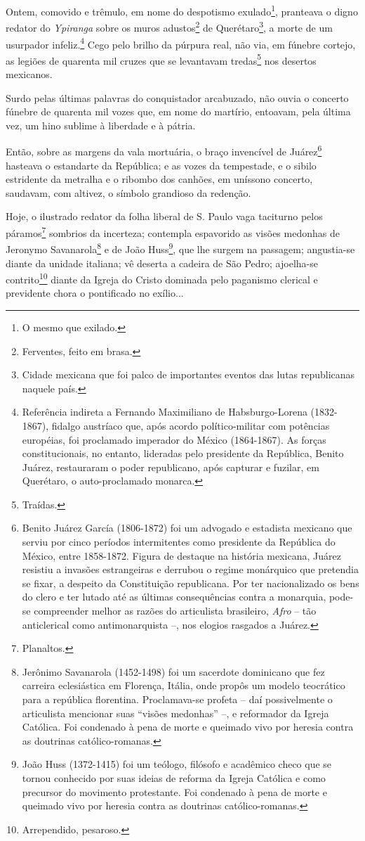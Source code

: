 Ontem, comovido e trêmulo, em nome do despotismo exulado\footnote{O
  mesmo que exilado.}, pranteava o digno redator do \emph{Ypiranga}
sobre os muros adustos\footnote{Ferventes, feito em brasa.} de
Querétaro\footnote{Cidade mexicana que foi palco de importantes
  eventos das lutas republicanas naquele país.}, a morte de um usurpador
infeliz.\footnote{Referência indireta a Fernando Maximiliano de
  Habsburgo-Lorena (1832-1867), fidalgo austríaco que, após acordo
  político-militar com potências européias, foi proclamado imperador do
  México (1864-1867). As forças constitucionais, no entanto, lideradas
  pelo presidente da República, Benito Juárez, restauraram o poder
  republicano, após capturar e fuzilar, em Querétaro, o auto-proclamado
  monarca.} Cego pelo brilho da púrpura real, não via, em fúnebre
cortejo, as legiões de quarenta mil cruzes que se levantavam
tredas\footnote{Traídas.} nos desertos mexicanos.

Surdo pelas últimas palavras do conquistador arcabuzado, não ouvia o
concerto fúnebre de quarenta mil vozes que, em nome do martírio,
entoavam, pela última vez, um hino sublime à liberdade e à pátria.

Então, sobre as margens da vala mortuária, o braço invencível de
Juárez\footnote{Benito Juárez García (1806-1872) foi um advogado e
  estadista mexicano que serviu por cinco períodos intermitentes como
  presidente da República do México, entre 1858-1872. Figura de destaque
  na história mexicana, Juárez resistiu a invasões estrangeiras e
  derrubou o regime monárquico que pretendia se fixar, a despeito da
  Constituição republicana. Por ter nacionalizado os bens do clero e ter
  lutado até as últimas consequências contra a monarquia, pode-se
  compreender melhor as razões do articulista brasileiro, \emph{Afro} --
  tão anticlerical como antimonarquista --, nos elogios rasgados a
  Juárez.} hasteava o estandarte da República; e as vozes da tempestade,
e o sibilo estridente da metralha e o ribombo dos canhões, em uníssono
concerto, saudavam, com altivez, o símbolo grandioso da redenção.

Hoje, o ilustrado redator da folha liberal de S. Paulo vaga taciturno
pelos páramos\footnote{Planaltos.} sombrios da incerteza; contempla
espavorido as visões medonhas de Jeronymo Savanarola\footnote{Jerônimo
  Savanarola (1452-1498) foi um sacerdote dominicano que fez carreira
  eclesiástica em Florença, Itália, onde propôs um modelo teocrático
  para a república florentina. Proclamava-se profeta -- daí
  possivelmente o articulista mencionar suas ``visões medonhas'' --, e
  reformador da Igreja Católica. Foi condenado à pena de morte e
  queimado vivo por heresia contra as doutrinas católico-romanas.} e de
João Huss\footnote{João Huss (1372-1415) foi um teólogo, filósofo e
  acadêmico checo que se tornou conhecido por suas ideias de reforma da
  Igreja Católica e como precursor do movimento protestante. Foi
  condenado à pena de morte e queimado vivo por heresia contra as
  doutrinas católico-romanas.}, que lhe surgem na passagem; angustia-se
diante da unidade italiana; vê deserta a cadeira de São Pedro;
ajoelha-se contrito\footnote{Arrependido, pesaroso.} diante da Igreja
do Cristo dominada pelo paganismo clerical e previdente chora o
pontificado no exílio...

